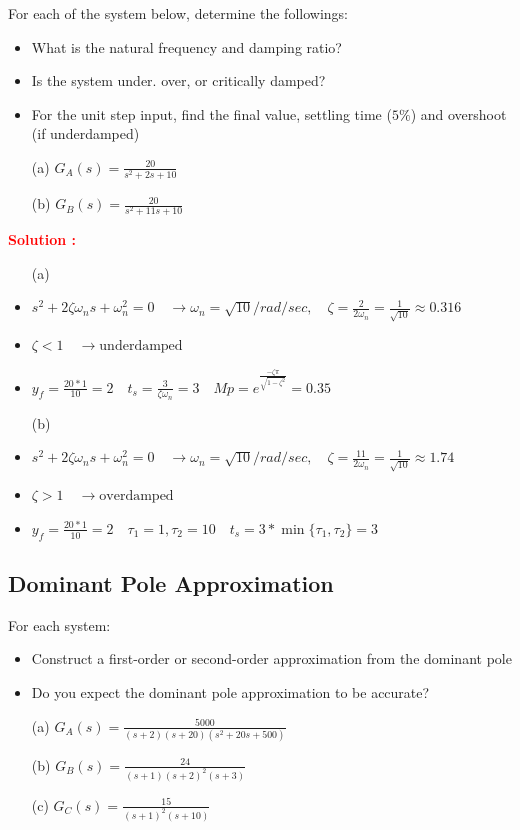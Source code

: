 \documentclass[12pt]{article}
\begin{document}
For each of the system below, determine the followings:
\begin{itemize}
    \item What is the natural frequency and damping ratio?
    \item Is the system under. over, or critically damped?
    \item For the unit step input, find the final value, settling time (\(5\%\)) and overshoot (if underdamped)
\end{itemize}
\begin{itemize}
    \item[(a)] \(G_A(s) = \frac{20}{s^2+2s+10}\)
    \item[(b)] \(G_B(s) = \frac{20}{s^2+11s+10}\)
\end{itemize}
\textbf{\textcolor{red}{Solution :}} \\
\begin{itemize}
    \item[(a)]
    \item \(s^2+2\zeta \omega_n s + \omega_n^2 = 0 \quad \rightarrow \omega_n = \sqrt{10} / rad/sec, \quad \zeta = \frac{2}{2\omega_n} = \frac{1}{\sqrt{10}} \approx 0.316\)
    \item \(\zeta < 1 \quad \rightarrow \text{underdamped}\)
    \item \(y_f = \frac{20*1}{10} = 2 \quad t_s = \frac{3}{\zeta \omega_n} = 3 \quad Mp = e^{\frac{-\zeta \pi}{\sqrt{1-\zeta^2}}} = 0.35\)
    \item[(b)]
    \item \(s^2+2\zeta \omega_n s + \omega_n^2 = 0 \quad \rightarrow \omega_n = \sqrt{10} / rad/sec, \quad \zeta = \frac{11}{2\omega_n} = \frac{1}{\sqrt{10}} \approx 1.74\)
    \item \(\zeta > 1 \quad \rightarrow \text{overdamped}\)
    \item \(y_f = \frac{20*1}{10} = 2 \quad \tau_1 = 1, \tau_2 = 10 \quad t_s = 3*\min\{\tau_1,\tau_2\} 
 = 3\)
\end{itemize}


\clearpage
\subsection{Dominant Pole Approximation}

For each system:
\begin{itemize}
    \item Construct a first-order or second-order approximation from the dominant pole
    \item Do you expect the dominant pole approximation to be accurate?
\end{itemize}
\begin{itemize}
    \item[(a)] \(G_A(s) = \frac{5000}{(s+2)(s+20)(s^2+20s+500)}\)
    \item[(b)] \(G_B(s) = \frac{24}{(s+1)(s+2)^2(s+3)}\)
    \item[(c)] \(G_C(s) = \frac{15}{(s+1)^2(s+10)}\)
\end{itemize}
\end{document}
